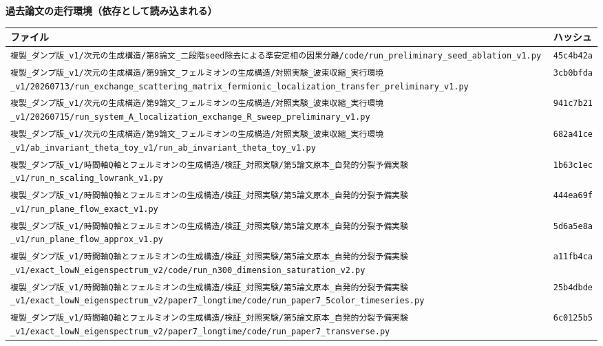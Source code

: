 \documentclass[
  10pt,
]{ltjsarticle}
\newcounter{none} %
\begin{document}
\textbf{過去論文の走行環境（依存として読み込まれる）}

{\def\LTcaptype{none} %
\begin{longtable}[]{@{}
  >{\raggedright\arraybackslash}p{}
  >{\raggedright\arraybackslash}p{}@{}}
\toprule\noalign{}
\begin{minipage}[b]{\linewidth}\raggedright
ファイル
\end{minipage} & \begin{minipage}[b]{\linewidth}\raggedright
ハッシュ
\end{minipage} \\
\midrule\noalign{}
\endhead
\bottomrule\noalign{}
\endlastfoot
\texttt{複製\_ダンプ版\_v1/次元の生成構造/第8論文\_二段階seed除去による準安定相の因果分離/code/run\_preliminary\_seed\_ablation\_v1.py}
& \texttt{45c4b42a} \\
\texttt{複製\_ダンプ版\_v1/次元の生成構造/第9論文\_フェルミオンの生成構造/対照実験\_波束収縮\_実行環境\_v1/20260713/run\_exchange\_scattering\_matrix\_fermionic\_localization\_transfer\_preliminary\_v1.py}
& \texttt{3cb0bfda} \\
\texttt{複製\_ダンプ版\_v1/次元の生成構造/第9論文\_フェルミオンの生成構造/対照実験\_波束収縮\_実行環境\_v1/20260715/run\_system\_A\_localization\_exchange\_R\_sweep\_preliminary\_v1.py}
& \texttt{941c7b21} \\
\texttt{複製\_ダンプ版\_v1/次元の生成構造/第9論文\_フェルミオンの生成構造/対照実験\_波束収縮\_実行環境\_v1/ab\_invariant\_theta\_toy\_v1/run\_ab\_invariant\_theta\_toy\_v1.py}
& \texttt{682a41ce} \\
\texttt{複製\_ダンプ版\_v1/時間軸Q軸とフェルミオンの生成構造/検証\_対照実験/第5論文原本\_自発的分裂予備実験\_v1/run\_n\_scaling\_lowrank\_v1.py}
& \texttt{1b63c1ec} \\
\texttt{複製\_ダンプ版\_v1/時間軸Q軸とフェルミオンの生成構造/検証\_対照実験/第5論文原本\_自発的分裂予備実験\_v1/run\_plane\_flow\_exact\_v1.py}
& \texttt{444ea69f} \\
\texttt{複製\_ダンプ版\_v1/時間軸Q軸とフェルミオンの生成構造/検証\_対照実験/第5論文原本\_自発的分裂予備実験\_v1/run\_plane\_flow\_approx\_v1.py}
& \texttt{5d6a5e8a} \\
\texttt{複製\_ダンプ版\_v1/時間軸Q軸とフェルミオンの生成構造/検証\_対照実験/第5論文原本\_自発的分裂予備実験\_v1/exact\_lowN\_eigenspectrum\_v2/code/run\_n300\_dimension\_saturation\_v2.py}
& \texttt{a11fb4ca} \\
\texttt{複製\_ダンプ版\_v1/時間軸Q軸とフェルミオンの生成構造/検証\_対照実験/第5論文原本\_自発的分裂予備実験\_v1/exact\_lowN\_eigenspectrum\_v2/paper7\_longtime/code/run\_paper7\_5color\_timeseries.py}
& \texttt{25b4dbde} \\
\texttt{複製\_ダンプ版\_v1/時間軸Q軸とフェルミオンの生成構造/検証\_対照実験/第5論文原本\_自発的分裂予備実験\_v1/exact\_lowN\_eigenspectrum\_v2/paper7\_longtime/code/run\_paper7\_transverse.py}
& \texttt{6c0125b5} \\
\end{longtable}
}
\end{document}
